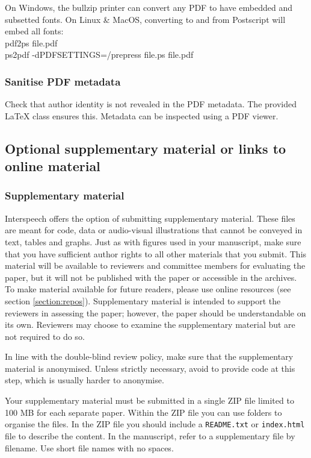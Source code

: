\documentclass[cameraready]{Interspeech}
\begin{document}
On Windows, the bullzip printer can convert any PDF to have embedded and subsetted fonts. On Linux \& MacOS, converting to and from Postscript will embed all fonts:
\\

\noindent\textsf{pdf2ps file.pdf}\\
\noindent\textsf{ps2pdf -dPDFSETTINGS=/prepress file.ps file.pdf}


\subsubsection{Sanitise PDF metadata}
\label{section:pdf_sanitise}

Check that author identity is not revealed in the PDF metadata. The provided \LaTeX\xspace class ensures this. Metadata can be inspected using a PDF viewer.


\subsection{Optional supplementary material or links to online material}
\label{section:multimedia}

\subsubsection{Supplementary material}
\label{section:supplementary}

Interspeech offers the option of submitting supplementary material.
These files are meant for code, data or audio-visual illustrations that cannot be conveyed in text, tables and graphs. Just as with figures used in your manuscript, make sure that you have sufficient author rights to all other materials that you submit. This material will be available to reviewers and committee members for evaluating the paper, but it will not be published with the paper or accessible in the archives. To make material available for future readers, please use online resources (see section \ref{section:repos}). Supplementary material is intended to support the reviewers in assessing the paper; however, the paper should be understandable on its own. Reviewers may choose to examine the supplementary material but are not required to do so.

In line with the double-blind review policy, make sure that the supplementary material is anonymised. Unless strictly necessary, avoid to provide code at this step, which is usually harder to anonymise.

Your supplementary material must be submitted in a single ZIP file limited to 100 MB for each separate paper. Within the ZIP file you can use folders to organise the files. In the ZIP file you should include a \texttt{README.txt} or \texttt{index.html} file to describe the content. In the manuscript, refer to a supplementary file by filename. Use short file names with no spaces.
\end{document}
